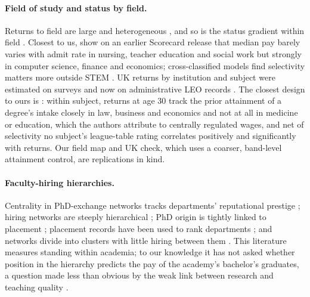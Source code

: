 \documentclass[11pt]{article}
\begin{document}
\paragraph{Field of study and status by field.} Returns to field are large and heterogeneous
\citep{kirkeboen2016field, altonji2012heterogeneity, altonji2016analysis, webber2014lifetime, kim2015field,
andrews2024returns}, and so is the status gradient within field \citep{eide2016where, quadlin2021same,
hastings2013some}. Closest to us, \citet{bloem2024understanding} show on an earlier Scorecard release that median pay barely varies with admit rate in nursing, teacher education
and social work but strongly in computer science, finance and economics; cross-classified models find
selectivity matters more outside STEM \citep{muse2024college}. UK returns by institution and subject were
estimated on surveys \citep{walker2011differences, walker2018university} and now on administrative LEO records
\citep{belfield2018impact, britton2019improving, britton2020impact}. The closest design to ours is
\citet{britton2022how}: within subject, returns at age 30 track the prior attainment of a degree's intake closely
in law, business and economics and not at all in medicine or education, which the authors attribute to centrally
regulated wages, and net of selectivity no subject's league-table rating correlates positively and significantly
with returns. Our field map and UK check, which uses a coarser, band-level attainment control, are replications in
kind.

\paragraph{Faculty-hiring hierarchies.} Centrality in PhD-exchange networks tracks departments' reputational
prestige \citep{burris2004academic}; hiring networks are steeply hierarchical \citep{clauset2015systematic,
wapman2022quantifying}; PhD origin is tightly linked to placement \citep{fowler2007social, headworth2016credential};
placement records have been used to rank departments \citep{amir2008ranking}; and networks divide into clusters with
little hiring between them \citep{tervio2011divisions}. This literature measures
standing within academia; to our knowledge it has not asked whether position in the hierarchy predicts the pay of
the academy's bachelor's graduates, a question made less than obvious by the weak link between research and
teaching quality \citep{hattie1996relationship}.
\end{document}
